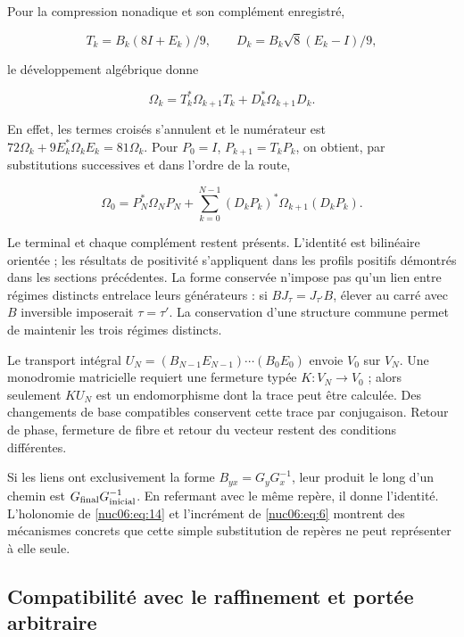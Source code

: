 Pour la compression nonadique et son complément enregistré,


\[
T_k=B_k(8I+E_k)/9,\qquad
D_k=B_k\sqrt8(E_k-I)/9,
\]

le développement algébrique donne


\begin{equation}
\Omega_k=T_k^*\Omega_{k+1}T_k+D_k^*\Omega_{k+1}D_k.
\label{nuc06:eq:17}
\end{equation}

En effet, les termes croisés s’annulent et le numérateur est \(72\Omega_k+9E_k^*\Omega_kE_k=81\Omega_k\). Pour \(P_0=I\), \(P_{k+1}=T_kP_k\), on obtient, par substitutions successives et dans l’ordre de la route,


\begin{equation}
\boxed{\quad
\Omega_0=P_N^*\Omega_NP_N+
\sum_{k=0}^{N-1}(D_kP_k)^*\Omega_{k+1}(D_kP_k).
\quad}
\label{nuc06:eq:18}
\end{equation}

Le terminal et chaque complément restent présents. L’identité est bilinéaire orientée ; les résultats de positivité s’appliquent dans les profils positifs démontrés dans les sections précédentes. La forme conservée n’impose pas qu’un lien entre régimes distincts entrelace leurs générateurs : si \(BJ_\tau=J_{\tau'}B\), élever au carré avec \(B\) inversible imposerait \(\tau=\tau'\). La conservation d’une structure commune permet de maintenir les trois régimes distincts.

Le transport intégral \(U_N=(B_{N-1}E_{N-1})\cdots(B_0E_0)\) envoie \(V_0\) sur \(V_N\). Une monodromie matricielle requiert une fermeture typée \(K:V_N\to V_0\) ; alors seulement \(KU_N\) est un endomorphisme dont la trace peut être calculée. Des changements de base compatibles conservent cette trace par conjugaison. Retour de phase, fermeture de fibre et retour du vecteur restent des conditions différentes.


Si les liens ont exclusivement la forme \(B_{yx}=G_yG_x^{-1}\), leur produit le long d’un chemin est \(G_{\rm final}G_{\rm inicial}^{-1}\). En refermant avec le même repère, il donne l’identité. L’holonomie de \eqref{nuc06:eq:14} et l’incrément de \eqref{nuc06:eq:6} montrent des mécanismes concrets que cette simple substitution de repères ne peut représenter à elle seule.

\subsection{Compatibilité avec le raffinement et portée arbitraire
}

